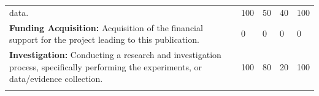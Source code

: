 \documentclass[a4paper,twoside=true,openright,parskip=full,chapterprefix=true,11pt,headings=normal,bibliography=totoc,listof=totoc,titlepage=on,captions=tableabove,draft=false]{scrreprt}
\theoremstyle{definition}
\theoremstyle{definition}
\theoremstyle{definition}
\theoremstyle{remark}
\begin{document}
\begin{longtable}[]{@{}lllll@{}}
\begin{minipage}[t]{0.49\columnwidth}
data.\strut
\end{minipage} & \begin{minipage}[t]{0.11\columnwidth}\raggedright
100\strut
\end{minipage} & \begin{minipage}[t]{0.09\columnwidth}\raggedright
50\strut
\end{minipage} & \begin{minipage}[t]{0.10\columnwidth}\raggedright
40\strut
\end{minipage} & \begin{minipage}[t]{0.07\columnwidth}\raggedright
100\strut
\end{minipage}\tabularnewline
\begin{minipage}[t]{0.49\columnwidth}\raggedright
\textbf{Funding Acquisition:} Acquisition of the financial support for
the project leading to this publication.\strut
\end{minipage} & \begin{minipage}[t]{0.11\columnwidth}\raggedright
0\strut
\end{minipage} & \begin{minipage}[t]{0.09\columnwidth}\raggedright
0\strut
\end{minipage} & \begin{minipage}[t]{0.10\columnwidth}\raggedright
0\strut
\end{minipage} & \begin{minipage}[t]{0.07\columnwidth}\raggedright
0\strut
\end{minipage}\tabularnewline
\begin{minipage}[t]{0.49\columnwidth}\raggedright
\textbf{Investigation:} Conducting a research and investigation process,
specifically performing the experiments, or data/evidence
collection.\strut
\end{minipage} & \begin{minipage}[t]{0.11\columnwidth}\raggedright
100\strut
\end{minipage} & \begin{minipage}[t]{0.09\columnwidth}\raggedright
80\strut
\end{minipage} & \begin{minipage}[t]{0.10\columnwidth}\raggedright
20\strut
\end{minipage} & \begin{minipage}[t]{0.07\columnwidth}\raggedright
100\strut
\end{minipage}\tabularnewline
\begin{minipage}[t]{0.49\columnwidth}\raggedright

\end{minipage}
\end{longtable}
\end{document}
